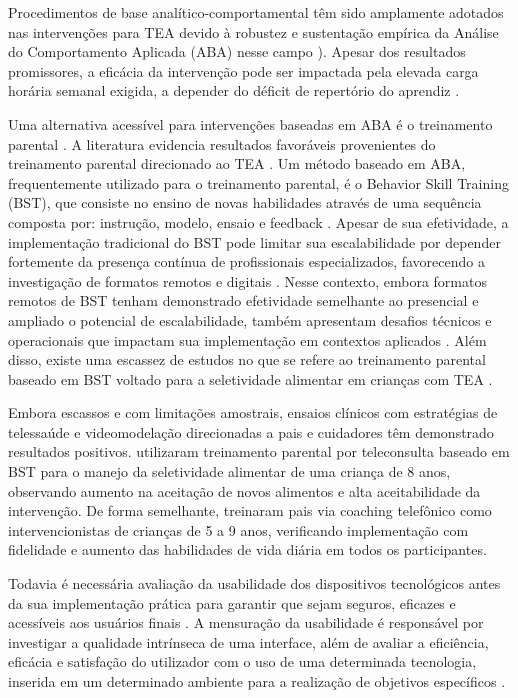\documentclass[portuguese]{textolivre}
\begin{document}
Procedimentos de base analítico-comportamental têm sido amplamente adotados nas intervenções para TEA devido à robustez e sustentação empírica da Análise do Comportamento Aplicada (ABA) nesse campo \cite{steinbrenner2020evidencebased,yu2020aba}). Apesar dos resultados promissores, a eficácia da intervenção pode ser impactada pela elevada carga horária semanal exigida, a depender do déficit de repertório do aprendiz \cite{casp2020practice}.

Uma alternativa acessível para intervenções baseadas em ABA é o treinamento parental \cite{dawsonsquibb2020parent,ijaz2021parent}. A literatura evidencia resultados favoráveis provenientes do treinamento parental direcionado ao TEA \cite{althoff2019parent,lee2021parentmediated,nevill2018metaanalysis,steinbrenner2020evidencebased}. Um método baseado em ABA, frequentemente utilizado para o treinamento parental, é o Behavior Skill Training (BST), que consiste no ensino de novas habilidades através de uma sequência composta por: instrução, modelo, ensaio e feedback \cite{gianoumis2012effects,sarokoff2004behavioralskills}. Apesar de sua efetividade, a implementação tradicional do BST pode limitar sua escalabilidade por depender fortemente da presença contínua de profissionais especializados, favorecendo a investigação de formatos remotos e digitais \cite{erath2021training}. Nesse contexto, embora formatos remotos de BST tenham demonstrado efetividade semelhante ao presencial e ampliado o potencial de escalabilidade, também apresentam desafios técnicos e operacionais que impactam sua implementação em contextos aplicados \cite{lerman2020remote}. Além disso, existe uma escassez de estudos no que se refere ao treinamento parental baseado em BST voltado para a seletividade alimentar em crianças com TEA \cite{correaferreira2025treinamento}.

Embora escassos e com limitações amostrais, ensaios clínicos com estratégias de telessaúde e videomodelação direcionadas a pais e cuidadores têm demonstrado resultados positivos. \textcite{bloomfield2019food} utilizaram treinamento parental por teleconsulta baseado em BST para o manejo da seletividade alimentar de uma criança de 8 anos, observando aumento na aceitação de novos alimentos e alta aceitabilidade da intervenção. De forma semelhante, \textcite{gerow2021telehealth} treinaram pais via coaching telefônico como intervencionistas de crianças de 5 a 9 anos, verificando implementação com fidelidade e aumento das habilidades de vida diária em todos os participantes.

Todavia é necessária avaliação da usabilidade dos dispositivos tecnológicos antes da sua implementação prática para garantir que sejam seguros, eficazes e acessíveis aos usuários finais \cite{mclaughlin2020evaluating}. A mensuração da usabilidade é responsável por investigar a qualidade intrínseca de uma interface, além de avaliar a eficiência, eficácia e satisfação do utilizador com o uso de uma determinada tecnologia, inserida em um determinado ambiente para a realização de objetivos específicos \cite{cybis2015ergonomia,nielsen2014usabilidade}.
\end{document}

